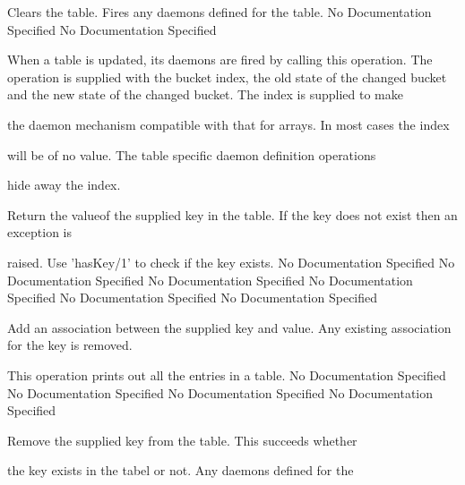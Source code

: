       Clears the table. Fires any daemons defined for the table.
No Documentation Specified
No Documentation Specified

      When a table is updated, its daemons are fired by calling this operation. 
      The operation is supplied with the bucket index, the old state of the changed 
      bucket and the new state of the changed bucket. The index is supplied to make

      the daemon mechanism compatible with that for arrays. In most cases the index

      will be of no value. The table specific daemon definition operations

      hide away the index.

      Return the valueof the supplied key in the table.
      If the key does not exist then an exception is

      raised. Use 'hasKey/1' to check if the key exists.
No Documentation Specified
No Documentation Specified
No Documentation Specified
No Documentation Specified
No Documentation Specified
No Documentation Specified

      Add an association between the supplied key and value.
      Any existing association for the key is removed.

      This operation prints out all the entries in a table.
No Documentation Specified
No Documentation Specified
No Documentation Specified
No Documentation Specified

     Remove the supplied key from the table. This succeeds whether

     the key exists in the tabel or not. Any daemons defined for the

